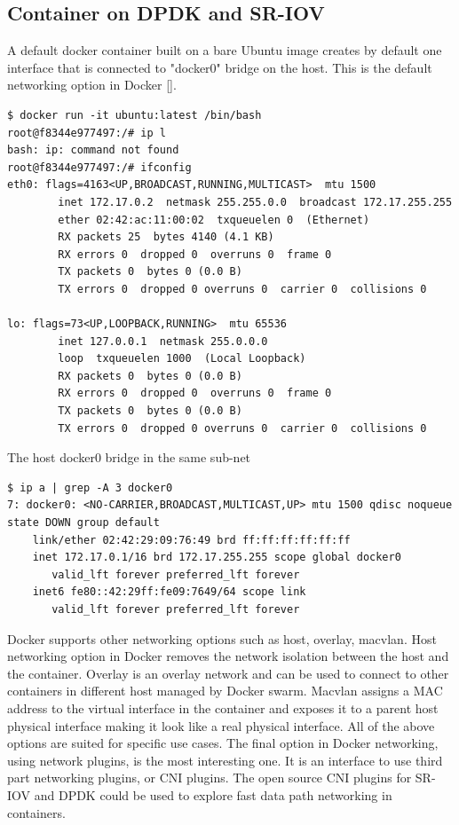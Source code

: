 \documentclass[english, 12pt, a4paper, elec, utf8, a-1b, online]{aaltothesis}
\begin{document}
\subsection{Container on DPDK and SR-IOV}
A default docker container built on a bare Ubuntu image creates by default one interface that is connected to "docker0" bridge on the host. This is the default networking option in Docker []. 

\begin{lstlisting}[basicstyle={\small\ttfamily}]
$ docker run -it ubuntu:latest /bin/bash
root@f8344e977497:/# ip l
bash: ip: command not found
root@f8344e977497:/# ifconfig 
eth0: flags=4163<UP,BROADCAST,RUNNING,MULTICAST>  mtu 1500
        inet 172.17.0.2  netmask 255.255.0.0  broadcast 172.17.255.255
        ether 02:42:ac:11:00:02  txqueuelen 0  (Ethernet)
        RX packets 25  bytes 4140 (4.1 KB)
        RX errors 0  dropped 0  overruns 0  frame 0
        TX packets 0  bytes 0 (0.0 B)
        TX errors 0  dropped 0 overruns 0  carrier 0  collisions 0

lo: flags=73<UP,LOOPBACK,RUNNING>  mtu 65536
        inet 127.0.0.1  netmask 255.0.0.0
        loop  txqueuelen 1000  (Local Loopback)
        RX packets 0  bytes 0 (0.0 B)
        RX errors 0  dropped 0  overruns 0  frame 0
        TX packets 0  bytes 0 (0.0 B)
        TX errors 0  dropped 0 overruns 0  carrier 0  collisions 0
\end{lstlisting}
The host docker0 bridge in the same sub-net
\begin{lstlisting}[basicstyle={\small\ttfamily}]
$ ip a | grep -A 3 docker0
7: docker0: <NO-CARRIER,BROADCAST,MULTICAST,UP> mtu 1500 qdisc noqueue state DOWN group default 
    link/ether 02:42:29:09:76:49 brd ff:ff:ff:ff:ff:ff
    inet 172.17.0.1/16 brd 172.17.255.255 scope global docker0
       valid_lft forever preferred_lft forever
    inet6 fe80::42:29ff:fe09:7649/64 scope link 
       valid_lft forever preferred_lft forever
\end{lstlisting}

Docker supports other networking options such as host, overlay, macvlan. Host networking option in Docker removes the network isolation between the host and the container. Overlay is an overlay network and can be used to connect to other containers in different host managed by Docker swarm. Macvlan assigns a MAC address to the virtual interface in the container and exposes it to a parent host physical interface making it look like a real physical interface. All of the above options are suited for specific use cases. The final option in Docker networking, using network plugins, is the most interesting one. It is an interface to use third part networking plugins, or CNI plugins. The open source CNI plugins for SR-IOV and DPDK could be used to explore fast data path networking in containers.
\end{document}
